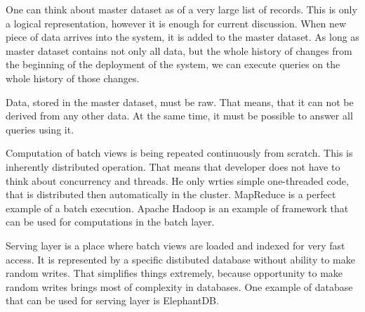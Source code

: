 One can think about master dataset as of a very large list of records.
This is only a logical representation, however it is enough for current
discussion.
When new piece of data arrives into the system, it is added to the master
dataset.
As long as master dataset contains not only all data, but the whole history of
changes from the beginning of the deployment of the system, we can execute
queries on the whole history of those changes.

Data, stored in the master dataset, must be raw.
That means, that it can not be derived from any other data.
At the same time, it must be possible to answer all queries using it. 

Computation of batch views is being repeated continuously from scratch.
This is inherently distributed operation.
That means that developer does not have to think about concurrency and threads.
He only wrties simple one-threaded code, that is distributed then
automatically in the cluster.
MapReduce is a perfect example of a batch execution.
Apache Hadoop is an example of framework that can be used for computations in
the batch layer.


Serving layer is a place where batch views are loaded and indexed for very fast
access.
It is represented by a specific distibuted database without ability to make random writes.
That simplifies things extremely, because opportunity to make random writes
brings most of complexity in databases.
One example of database that can be used for serving layer is ElephantDB.


